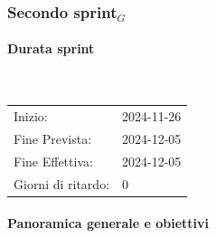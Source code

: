 \documentclass[10pt]{article}
\begin{document}
{{%

\newpage
\subsubsection{Secondo sprint$_G$}
\label{secondo-sprint$_G$}
    
    \paragraph{Durata sprint}\mbox{}\\
    \vspace{-1.5em}
    \begin{table}[h] 
    \renewcommand{\arraystretch}{1.2}  
    \begin{tabular}{ l l }
        Inizio: & 2024-11-26 \\
        Fine Prevista: & 2024-12-05 \\
        Fine Effettiva: & 2024-12-05 \\
        Giorni di ritardo: & 0 \\
    \end{tabular}
    \end{table}
    \vspace{-2em}
    {\renewcommand{\arraystretch}{1.5}%
    
    \paragraph{Panoramica generale e obiettivi}\mbox{}\vspace{0.4em}
    
}}}
\end{document}
